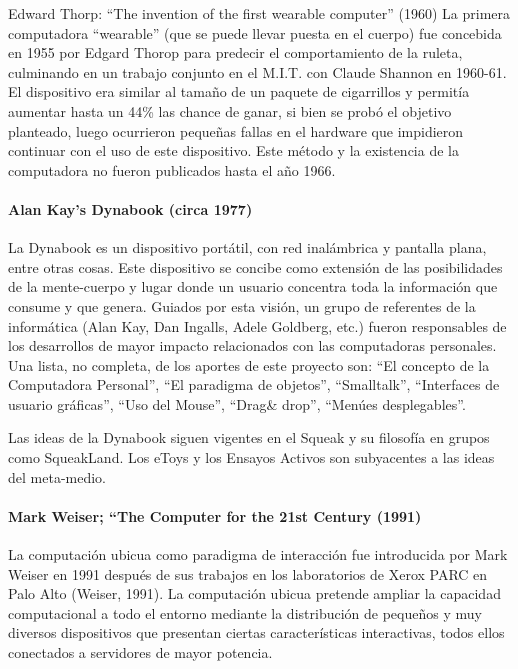 Edward Thorp: “The invention of the first wearable computer” (1960) La primera computadora “wearable” (que se puede llevar puesta en el cuerpo) fue concebida en 1955 por Edgard Thorop para predecir el comportamiento de la
ruleta, culminando en un trabajo conjunto en el M.I.T. con Claude Shannon en 1960-61. El dispositivo era similar al tamaño de un paquete de cigarrillos y permitía aumentar hasta un 44\% las chance de ganar, si bien se probó el objetivo planteado, luego ocurrieron pequeñas fallas en el hardware que impidieron continuar con el uso de este
dispositivo. Este método y la existencia de la computadora no fueron publicados hasta el año
1966.


\paragraph {Alan Kay's Dynabook (circa 1977)} 

La Dynabook es un dispositivo portátil, con red inalámbrica y pantalla plana,
entre otras cosas. Este dispositivo se concibe como extensión de las posibilidades de la mente-cuerpo y lugar donde un usuario concentra toda la información que consume y que genera. Guiados por esta visión, un grupo de referentes de la informática (Alan Kay, Dan Ingalls, Adele Goldberg, etc.) fueron responsables de los desarrollos de mayor impacto relacionados con las computadoras personales. Una lista, no completa, de los
aportes de este proyecto son: “El concepto de la Computadora Personal”, “El paradigma de objetos”, “Smalltalk”, “Interfaces de usuario gráficas”, “Uso del Mouse”, “Drag& drop”, “Menúes desplegables”.

Las ideas de la Dynabook siguen vigentes en el Squeak y su filosofía en grupos como SqueakLand. Los eToys y los Ensayos Activos son subyacentes a las ideas del meta-medio.


\paragraph {Mark Weiser; “The Computer for the 21st Century (1991)}  

La computación ubicua como paradigma de interacción fue introducida por Mark Weiser en 1991 después de sus trabajos en los laboratorios de Xerox PARC en Palo Alto (Weiser, 1991). La computación ubicua pretende ampliar la capacidad computacional a todo el entorno mediante la distribución de pequeños y muy diversos
dispositivos que presentan ciertas características interactivas, todos ellos conectados a
servidores de mayor potencia.


